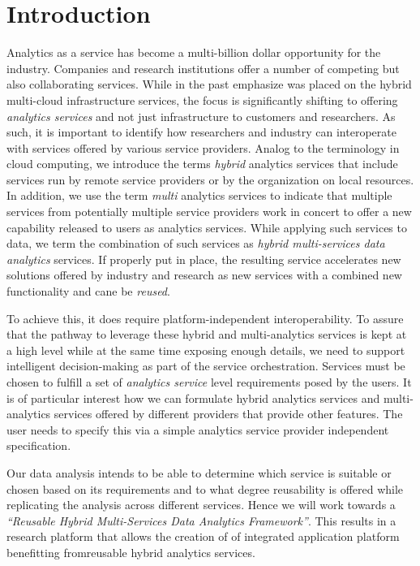 
\section{Introduction}
\label{sec:summary}


Analytics as a service has become a multi-billion dollar opportunity
for the industry. Companies and research institutions offer a number
of competing but also collaborating services. While in the past
emphasize was placed on the hybrid multi-cloud infrastructure
services, the focus is significantly shifting to offering {\em
analytics services} and not just infrastructure to customers and
researchers. As such, it is important to identify how researchers and
industry can interoperate with services offered by various service
providers. Analog to the terminology in cloud computing, we introduce
the terms {\em hybrid} analytics services that include services run by
remote service providers or by the organization on local resources. In
addition, we use the term {\em multi} analytics services to indicate
that multiple services from potentially multiple service providers
work in concert to offer a new capability released to users as
analytics services. While applying such services to data, we term the
combination of such services as {\em hybrid multi-services data
analytics} services. If properly put in place, the resulting service
accelerates new solutions offered by industry and research as new
services with a combined new functionality and cane be {\em reused}.

To achieve this, it does require platform-independent
interoperability.  To assure that the pathway to leverage these hybrid
and multi-analytics services is kept at a high level while at the same
time exposing enough details, we need to support intelligent
decision-making as part of the service orchestration. Services must be
chosen to fulfill a set of {\em analytics service} level requirements
posed by the users. It is of particular interest how we can formulate
hybrid analytics services and multi-analytics services offered by
different providers that provide other features. The user needs to
specify this via a simple analytics service provider independent
specification.

Our data analysis intends to be able to determine which service is
suitable or chosen based on its requirements and to what degree
reusability is offered while replicating the analysis across different
services. Hence we will work towards a {\em ``Reusable Hybrid
Multi-Services Data Analytics Framework''}. This results in a research
platform that allows the creation of of integrated application
platform benefitting fromreusable hybrid analytics services.


